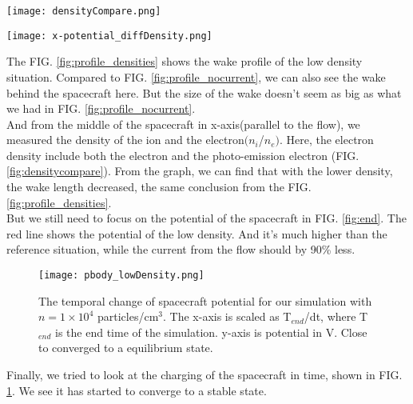 \documentclass[aip, 
rsi, 
amsmath,
amssymb,
longbibliography,
reprint]{revtex4-1}
\begin{document}
\begin{figure*}
\texttt{[image: densityCompare.png]}
\caption{Relation between ion and electron density for different densities and same current.The red line shows Low density for current value $j_{ph} = 10^{-5}$ A/m$^3$,the blue one shows high density for current value $j_{ph} = 10^{-4}$ A/m$^3$} \label{fig:densitycompare}
\end{figure*}

\begin{figure*}
\texttt{[image: x-potential\_diffDensity.png]}
\caption{The potential near the spacecraft along x-axis for different plasma densities. The upper line corresponds to density $10^5$ particles/cm$^3$, the lowest line corresponds to density value $10^4$ particles/cm$^3$. \label{fig:end}}
\end{figure*}

The FIG. \ref{fig:profile_densities} shows the wake profile of the low density situation. Compared to FIG. \ref{fig:profile_nocurrent}, we can also see the wake behind the spacecraft here. But the size of the wake doesn't seem as big as what we had in FIG. \ref{fig:profile_nocurrent}.\\

And from the middle of the spacecraft in x-axis(parallel to the flow), we measured the density of the ion and the electron$(n_i$/$n_e)$. Here, the electron density include both the electron and the photo-emission electron (FIG. \ref{fig:densitycompare}). From the graph, we can find that with the lower density, the wake length decreased, the same conclusion from the FIG. \ref{fig:profile_densities}.\\

But we still need to focus on the potential of the spacecraft in FIG. \ref{fig:end}. The red line shows the potential of the low density. And it's much higher than the reference situation, while the current from the flow should by 90\% less.\\

\begin{figure}
\texttt{[image: pbody\_lowDensity.png]}
\caption{The temporal change of spacecraft potential for our simulation with $n = 1\times 10^{4}$ particles/cm$^3$. The x-axis is scaled as T$_{end}$/dt, where T$_{end}$ is the end time of the simulation. y-axis is potential in V. Close to converged to a equilibrium state. \label{fig:DensityTime}}
\end{figure}

Finally, we tried to look at the charging of the spacecraft in time, shown in FIG. \ref{fig:DensityTime}. We see it has started to converge to a stable state.
\end{document}
